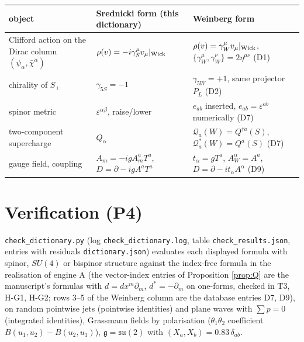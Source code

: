 \documentclass[11pt]{article}
\theoremstyle{definition}
\begin{document}
\begin{center}\small
\begin{tabular}{p{3.6cm}|p{5cm}|p{6.3cm}}
object & Srednicki form (this dictionary) & Weinberg form \\
\hline
Clifford action on the Dirac column $(\psi_\alpha,\bar\chi^{\dot\alpha})$ & $\rho(v)=-i\gamma_S^\mu v_\mu|_{\rm Wick}$ & $\rho(v)=\gamma_W^\mu v_\mu|_{\rm Wick}$, $\{\gamma_W^\mu,\gamma_W^\nu\}=2\eta^{\mu\nu}$ (D1) \\
chirality of $S_+$ & $\gamma_{5S}=-1$ & $\gamma_{5W}=+1$, same projector $P_L$ (D2) \\
spinor metric & $\varepsilon^{\alpha\beta}$, raise/lower & $e_{ab}$ inserted, $e_{ab}=\varepsilon^{ab}$ numerically (D7) \\
two-component supercharge & $Q_\alpha$ & $\mathcal Q_a(W)=Q^{\dagger\dot a}(S)$, $\mathcal Q^*_a(W)=Q^a(S)$ (D7) \\
gauge field, coupling & $A_m=-igA^a_mT^a$, $D=\partial-igA^aT^a$ & $t_\alpha=gT^a$, $A^\alpha_W=A^a$, $D=\partial-it_\alpha A^\alpha$ (D9) \\
\end{tabular}
\end{center}

\section{Verification (P4)}

\texttt{check\_dictionary.py} (log \texttt{check\_dictionary.log}, table \texttt{check\_results.json}, entries with residuals \texttt{dictionary.json}) evaluates each displayed formula with spinor, $SU(4)$ or bispinor structure against the index-free formula in the realisation of engine A (the vector-index entries of Proposition \ref{prop:Q} are the manuscript's formulas with $d=dx^m\partial_m$, $d^*=-\partial_m$ on one-forms, checked in T3, H-G1, H-G2; rows 3--5 of the Weinberg column are the database entries D7, D9), on random pointwise jets (pointwise identities) and plane waves with $\sum p=0$ (integrated identities), Grassmann fields by polarisation ($\theta_1\theta_2$ coefficient $B(u_1,u_2)-B(u_2,u_1)$), $\mathfrak g=\mathfrak{su}(2)$ with $(X_a,X_b)=0.83\,\delta_{ab}$.
\end{document}
